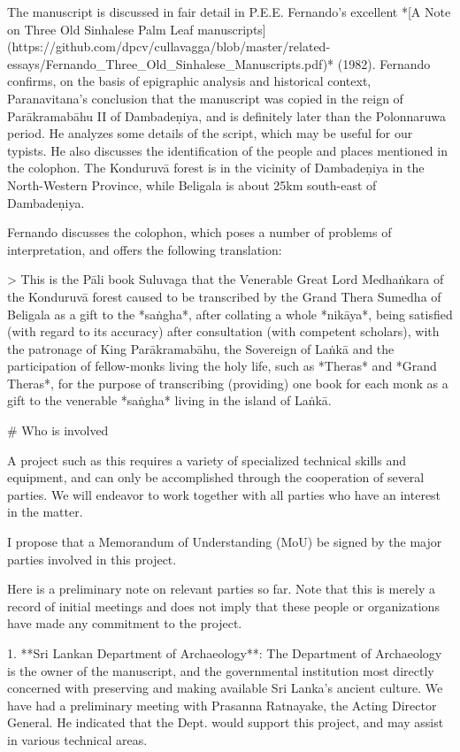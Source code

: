 \documentclass[11pt, openany,a5paper]{article}
\begin{document}
\begin{markdown}
The manuscript is discussed in fair detail in P.E.E. Fernando’s excellent *[A Note on Three Old Sinhalese Palm Leaf manuscripts](https://github.com/dpcv/cullavagga/blob/master/related-essays/Fernando_Three_Old_Sinhalese_Manuscripts.pdf)* (1982). Fernando confirms, on the basis of epigraphic analysis and historical context, Paranavitana’s conclusion that the manuscript was copied in the reign of Parākramabāhu II of Dambadeṇiya, and is definitely later than the Polonnaruwa period. He analyzes some details of the script, which may be useful for our typists. He also discusses the identification of the people and places mentioned in the colophon. The Konduruvā forest is in the vicinity of Dambadeṇiya in the North-Western Province, while Beligala is about 25km south-east of Dambadeṇiya.

Fernando discusses the colophon, which poses a number of problems of interpretation, and offers the following translation:

> This is the Pāli book Suluvaga that the Venerable Great Lord Medhaṅkara of the Konduruvā forest caused to be transcribed by the Grand Thera Sumedha of Beligala as a gift to the *saṅgha*, after collating a whole *nikāya*, being satisfied (with regard to its accuracy) after consultation (with competent scholars), with the patronage of King Parākramabāhu, the Sovereign of Laṅkā and the participation of fellow-monks living the holy life, such as *Theras* and *Grand Theras*, for the purpose of transcribing (providing) one book for each monk as a gift to the venerable *saṅgha* living in the island of Laṅkā.

# Who is involved

A project such as this requires a variety of specialized technical skills and equipment, and can only be accomplished through the cooperation of several parties. We will endeavor to work together with all parties who have an interest in the matter.

I propose that a Memorandum of Understanding (MoU) be signed by the major parties involved in this project.

Here is a preliminary note on relevant parties so far. Note that this is merely a record of initial meetings and does not imply that these people or organizations have made any commitment to the project.

1. **Sri Lankan Department of Archaeology**: The Department of Archaeology is the owner of the manuscript, and the governmental institution most directly concerned with preserving and making available Sri Lanka’s ancient culture. We have had a preliminary meeting with Prasanna Ratnayake, the Acting Director General. He indicated that the Dept. would support this project, and may assist in various technical areas.


\end{markdown}
\end{document}

